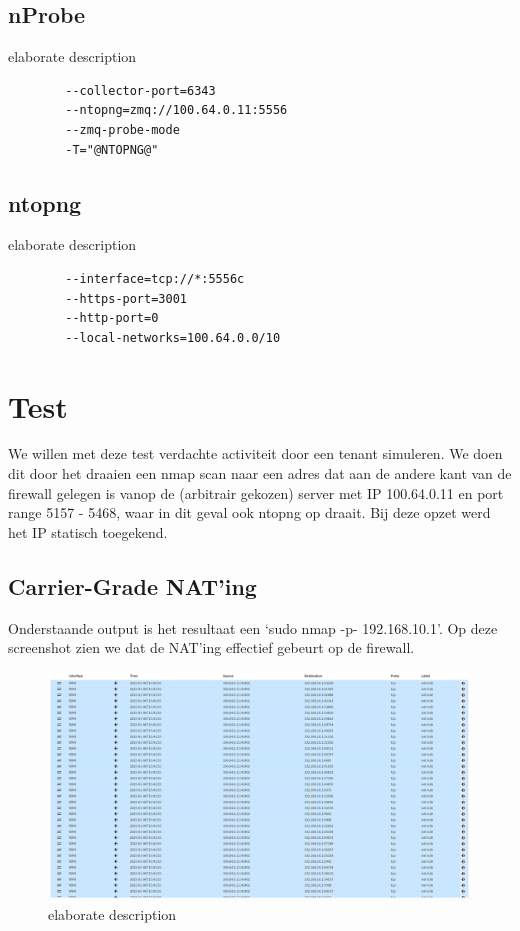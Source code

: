 \subsection{nProbe}
\begin{listing}[!htbp]
    \caption[nProbe configuration]{elaborate description}
    \label{code:nProbeConf}

    \begin{verbatim}
        --collector-port=6343
        --ntopng=zmq://100.64.0.11:5556
        --zmq-probe-mode
        -T="@NTOPNG@"
    \end{verbatim}
\end{listing}

\subsection{ntopng}
\begin{listing}[!htbp]
    \caption[ntopng configuration]{elaborate description}
    \label{code:ntopngConf}

    \begin{verbatim}
        --interface=tcp://*:5556c
        --https-port=3001
        --http-port=0
        --local-networks=100.64.0.0/10
    \end{verbatim}
\end{listing}

\section{Test}
We willen met deze test verdachte activiteit door een tenant simuleren. We doen dit door het draaien een nmap scan naar een adres dat aan de andere kant van de firewall gelegen is vanop de (arbitrair gekozen) server met IP 100.64.0.11 en port range 5157 - 5468, waar in dit geval ook ntopng op draait. Bij deze opzet werd het IP statisch toegekend.

\subsection{Carrier-Grade NAT’ing}
Onderstaande output is het resultaat een ‘sudo nmap -p- 192.168.10.1’. Op deze screenshot zien we dat de NAT’ing effectief gebeurt op de firewall.

\begin{figure}[H]
    \includegraphics[width=\textwidth]{graphics/nmap_nat_table.PNG}
    \caption[OPNsense CGN regels in werking deel 1]{elaborate description}
    \label{fig:FirewallGCNWorksA}
\end{figure}


